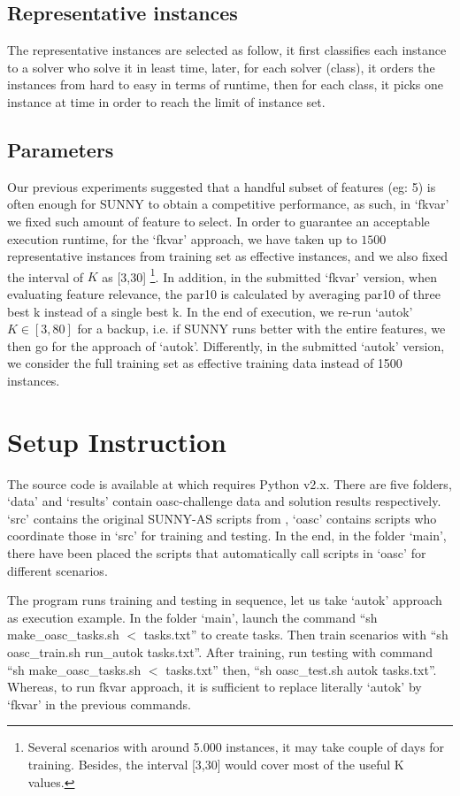 \documentclass[tablecaption=bottom,wcp]{jmlr} %
\begin{document}
\subsection{Representative instances}
The representative instances are selected as follow, it first classifies each instance to a solver who solve it in least time, later, for each solver (class), it orders the instances from hard to easy in terms of runtime, then for each class, it picks one instance at time in order to reach the limit of instance set. 

\subsection{Parameters}
Our previous experiments \cite{DBLP:conf/cilc/AmadiniBGLM15} suggested that a handful subset of features (eg: 5) is often enough for SUNNY to obtain a competitive performance, as such, in `fkvar' we fixed such amount of feature to select. In order to guarantee an acceptable execution runtime, for the `fkvar' approach, we have taken up to $1500$ representative instances from training set as effective instances, and we also fixed the interval of $K$ as [3,30] \footnote{Several scenarios with around 5.000 instances, it may take couple of days for training. Besides, the interval [3,30] would cover most of the useful K values. }. In addition, in the submitted `fkvar' version, when evaluating feature relevance, the par10 is calculated by averaging par10 of three best k instead of a single best k. In the end of execution, we re-run `autok' $K \in [3,80]$ for a backup, i.e. if SUNNY runs better with the entire features, we then go for the approach of `autok'. Differently, in the submitted `autok' version, we consider the full training set as effective training data instead of 1500 instances. 

\section{Setup Instruction}

The source code is available at \cite{sunnyoasc} which requires Python v2.x. There are five folders, `data' and `results' contain oasc-challenge data and solution results respectively. `src' contains the original SUNNY-AS scripts from \cite{sunnyas}, `oasc' contains scripts who coordinate those in `src' for training and testing. In the end, in the folder `main', there have been placed the scripts that automatically call scripts in `oasc' for different scenarios. 

The program runs training and testing in sequence, let us take `autok' approach as execution example. In the folder `main', launch the command ``sh make\_oasc\_tasks.sh $<$ tasks.txt'' to create tasks. Then train scenarios with ``sh oasc\_train.sh run\_autok tasks.txt''. After training, run testing with command ``sh make\_oasc\_tasks.sh $<$ tasks.txt'' then, ``sh oasc\_test.sh autok tasks.txt''. Whereas, to run fkvar approach, it is sufficient to replace literally `autok' by `fkvar' in the previous commands. 



\appendix
\end{document}
